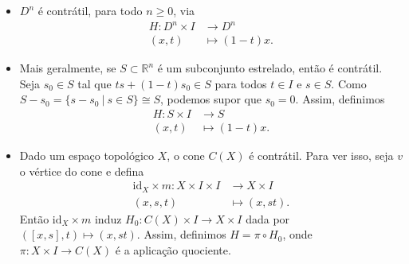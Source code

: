 \begin{ex}
    \begin{itemize}
        \item $D^n$ é contrátil, para todo $n\geq 0$, %
        via
        \begin{align*}
            H: D^n \times I &\to D^n\\
            (x,t) &\mapsto (1-t)x.
        \end{align*}
        \item Mais geralmente, se $S \subset \mathbb{R}^n$ é um subconjunto estrelado, então é contrátil. Seja $s_0\in S$ tal que $ts + (1-t)s_0 \in S$ para todos $t\in I$ e $s\in S$. Como $S-s_0 = \{s-s_0~|~s\in S\} \cong S$, podemos supor que $s_0 = 0$. %
        Assim, definimos
        \begin{align*}
            H: S \times I &\to S\\
            (x,t) &\mapsto (1-t)x.
        \end{align*}
        \item Dado um espaço topológico $X$, o cone $C(X)$ é contrátil. Para ver isso, seja $v$ o vértice do cone e defina%
        \begin{align*}
            \text{id}_X\times m: X\times I \times I &\to X\times I\\
            (x,s,t) &\mapsto (x,st).
        \end{align*}
        Então $\text{id}_X\times m$ induz $H_0: C(X)\times I\to X\times I$ dada por $([x,s],t) \mapsto (x,st)$. Assim, definimos $H = \pi \circ H_0$, onde $\pi: X\times I \to C(X)$ é a aplicação quociente.
    \end{itemize}
\end{ex}